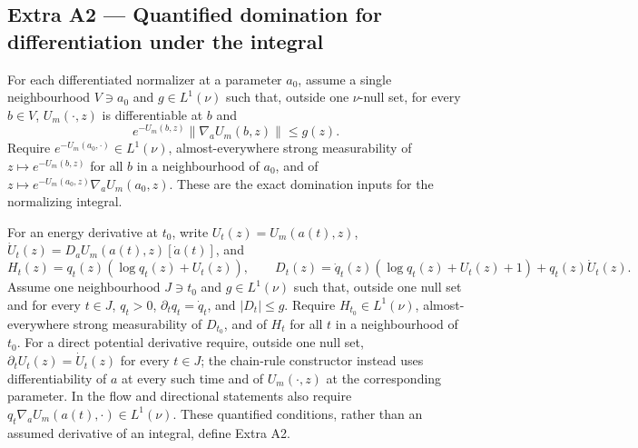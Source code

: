 \documentclass[11pt,a4paper]{report}
\begin{document}
\subsection{\texorpdfstring{Extra A2 — Quantified domination for differentiation under the integral}{Extra A2 — Quantified domination for differentiation under the integral}}


For each differentiated normalizer at a parameter \(a_0\), assume a single neighbourhood \(V\ni a_0\) and \(g\in L^1(\nu)\) such that, outside one \(\nu\)-null set, for every \(b\in V\), \(U_m(\cdot,z)\) is differentiable at \(b\) and
        \[e^{-U_m(b,z)}\|\nabla_aU_m(b,z)\|\le g(z).\]
        Require \(e^{-U_m(a_0,\cdot)}\in L^1(\nu)\), almost-everywhere strong measurability of \(z\mapsto e^{-U_m(b,z)}\) for all \(b\) in a neighbourhood of \(a_0\), and of \(z\mapsto e^{-U_m(a_0,z)}\nabla_aU_m(a_0,z)\). These are the exact domination inputs for the normalizing integral.




For an energy derivative at \(t_0\), write \(U_t(z)=U_m(a(t),z)\), \(\dot U_t(z)=D_aU_m(a(t),z)[\dot a(t)]\), and
        \[H_t(z)=q_t(z)(\log q_t(z)+U_t(z)),\qquad
          D_t(z)=\dot q_t(z)(\log q_t(z)+U_t(z)+1)+q_t(z)\dot U_t(z).\]
        Assume one neighbourhood \(J\ni t_0\) and \(g\in L^1(\nu)\) such that, outside one null set and for every \(t\in J\), \(q_t>0\), \(\partial_tq_t=\dot q_t\), and \(|D_t|\le g\). Require \(H_{t_0}\in L^1(\nu)\), almost-everywhere strong measurability of \(D_{t_0}\), and of \(H_t\) for all \(t\) in a neighbourhood of \(t_0\). For a direct potential derivative require, outside one null set, \(\partial_tU_t(z)=\dot U_t(z)\) for every \(t\in J\); the chain-rule constructor instead uses differentiability of \(a\) at every such time and of \(U_m(\cdot,z)\) at the corresponding parameter. In the flow and directional statements also require \(q_t\nabla_aU_m(a(t),\cdot)\in L^1(\nu)\). These quantified conditions, rather than an assumed derivative of an integral, define Extra A2.
\end{document}
